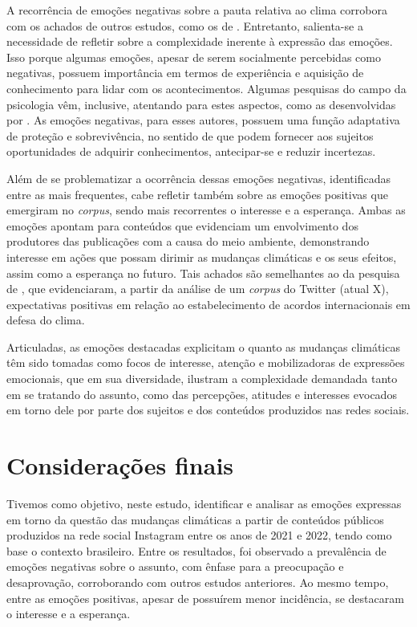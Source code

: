 \documentclass[portuguese]{textolivre}
\begin{document}
A recorrência de emoções negativas sobre a pauta relativa ao clima corrobora com os achados de outros estudos, como os de \textcite{cody2015climate,flores2018emociones}. Entretanto, salienta-se a necessidade de refletir sobre a complexidade inerente à expressão das emoções. Isso porque algumas emoções, apesar de serem socialmente percebidas como negativas, possuem importância em termos de experiência e aquisição de conhecimento para lidar com os acontecimentos. Algumas pesquisas do campo da psicologia vêm, inclusive, atentando para estes aspectos, como as desenvolvidas por \textcite{parrott2014positive,niehoff2020curiosity}. As emoções negativas, para esses autores, possuem uma função adaptativa de proteção e sobrevivência, no sentido de que podem fornecer aos sujeitos oportunidades de adquirir conhecimentos, antecipar-se e reduzir incertezas.

Além de se problematizar a ocorrência dessas emoções negativas, identificadas entre as mais frequentes, cabe refletir também sobre as emoções positivas que emergiram no \textit{corpus}, sendo mais recorrentes o interesse e a esperança. Ambas as emoções apontam para conteúdos que evidenciam um envolvimento dos produtores das publicações com a causa do meio ambiente, demonstrando interesse em ações que possam dirimir as mudanças climáticas e os seus efeitos, assim como a esperança no futuro. Tais achados são semelhantes ao da pesquisa de \textcite{balbe2017twitter}, que evidenciaram, a partir da análise de um \textit{corpus} do Twitter (atual X), expectativas positivas em relação ao estabelecimento de acordos internacionais em defesa do clima.

Articuladas, as emoções destacadas explicitam o quanto as mudanças climáticas têm sido tomadas como focos de interesse, atenção e mobilizadoras de expressões emocionais, que em sua diversidade, ilustram a complexidade demandada tanto em se tratando do assunto, como das percepções, atitudes e interesses evocados em torno dele por parte dos sujeitos e dos conteúdos produzidos nas redes sociais.

\section{Considerações finais}\label{sec-idioma}
Tivemos como objetivo, neste estudo, identificar e analisar as emoções expressas em torno da questão das mudanças climáticas a partir de conteúdos públicos produzidos na rede social Instagram entre os anos de 2021 e 2022, tendo como base o contexto brasileiro. Entre os resultados, foi observado a prevalência de emoções negativas sobre o assunto, com ênfase para a preocupação e desaprovação, corroborando com outros estudos anteriores. Ao mesmo tempo, entre as emoções positivas, apesar de possuírem menor incidência, se destacaram o interesse e a esperança.
\end{document}

